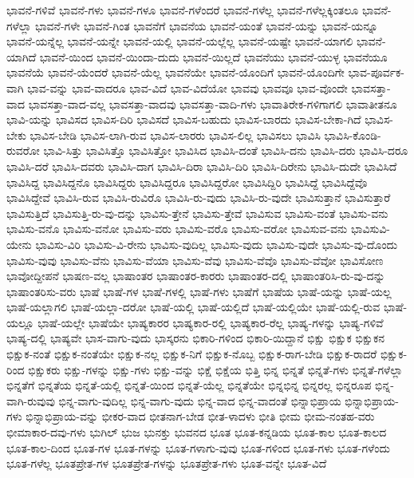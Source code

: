{ಭಾವನೆ-ಗಳಿವೆ
ಭಾವನೆ-ಗಳು
ಭಾವನೆ-ಗಳೂ
ಭಾವನೆ-ಗಳೆಂದರೆ
ಭಾವನೆ-ಗಳೆಲ್ಲ
ಭಾವನೆ-ಗಳೆಲ್ಲಕ್ಕಿಂತಲೂ
ಭಾವನೆ-ಗಳೆಲ್ಲಾ
ಭಾವನೆ-ಗಳೇ
ಭಾವನೆ-ಗಿಂತ
ಭಾವನೆಗೆ
ಭಾವನೆಯ
ಭಾವನೆ-ಯಂತೆ
ಭಾವನೆ-ಯನ್ನು
ಭಾವನೆ-ಯನ್ನೂ
ಭಾವನೆ-ಯನ್ನೆಲ್ಲ
ಭಾವನೆ-ಯನ್ನೇ
ಭಾವನೆ-ಯಲ್ಲಿ
ಭಾವನೆ-ಯಲ್ಲೆಲ್ಲ
ಭಾವನೆ-ಯಷ್ಟೇ
ಭಾವನೆ-ಯಾಗಲಿ
ಭಾವನೆ-ಯಾಗಿದೆ
ಭಾವನೆ-ಯಿಂದ
ಭಾವನೆ-ಯಿಂದಾ-ದುದು
ಭಾವನೆ-ಯಿಲ್ಲದೆ
ಭಾವನೆಯು
ಭಾವನೆ-ಯುಳ್ಳ
ಭಾವನೆಯೂ
ಭಾವನೆಯೆ
ಭಾವನೆ-ಯೆಂದರೆ
ಭಾವನೆ-ಯೆಲ್ಲ
ಭಾವನೆಯೇ
ಭಾವನೆ-ಯೊಂದಿಗೆ
ಭಾವನೆ-ಯೊಂದಿಗೇ
ಭಾವ-ಪೂರ್ವಕ-ವಾಗಿ
ಭಾವ-ವನ್ನು
ಭಾವ-ವಾದರೂ
ಭಾವ-ವಿದೆ
ಭಾವ-ವಿದೆಯೋ
ಭಾವವು
ಭಾವವೂ
ಭಾವ-ವೊಂದೇ
ಭಾವಸತ್ತಾ-ವಾದ
ಭಾವಸತ್ತಾ-ವಾದ-ವಲ್ಲ
ಭಾವಸತ್ತಾ-ವಾದವು
ಭಾವಸತ್ತಾ-ವಾದಿ-ಗಳು
ಭಾವಾತಿರೇಕ-ಗಳಿಗಾಗಲಿ
ಭಾವಾತೀತನೂ
ಭಾವಿ-ಯನ್ನು
ಭಾವಿಸದ
ಭಾವಿಸ-ದಿರಿ
ಭಾವಿಸದೆ
ಭಾವಿಸ-ಬಹುದು
ಭಾವಿಸ-ಬಾರದು
ಭಾವಿಸ-ಬೇಕಾ-ಗಿದೆ
ಭಾವಿಸ-ಬೇಕು
ಭಾವಿಸ-ಬೇಡಿ
ಭಾವಿಸ-ಲಾಗಿ-ರುವ
ಭಾವಿಸ-ಲಾರರು
ಭಾವಿಸ-ಲಿಲ್ಲ
ಭಾವಿಸಲು
ಭಾವಿಸಿ
ಭಾವಿಸಿ-ಕೊಂಡಿ-ರುವರೋ
ಭಾವಿ-ಸಿತ್ತು
ಭಾವಿಸಿತ್ತೊ
ಭಾವಿಸಿತ್ತೋ
ಭಾವಿಸಿದ
ಭಾವಿಸಿ-ದಂತೆ
ಭಾವಿಸಿ-ದನು
ಭಾವಿಸಿ-ದರು
ಭಾವಿಸಿ-ದರೂ
ಭಾವಿಸಿ-ದರೆ
ಭಾವಿಸಿ-ದವರು
ಭಾವಿಸಿ-ದಾಗ
ಭಾವಿಸಿ-ದಿರಾ
ಭಾವಿಸಿ-ದಿರಿ
ಭಾವಿಸಿ-ದಿರೇನು
ಭಾವಿಸಿ-ದುದೇ
ಭಾವಿಸಿದೆ
ಭಾವಿಸಿದ್ದ
ಭಾವಿಸಿದ್ದನೊ
ಭಾವಿಸಿದ್ದರು
ಭಾವಿಸಿದ್ದರೂ
ಭಾವಿಸಿದ್ದರೋ
ಭಾವಿಸಿದ್ದಿರಿ
ಭಾವಿಸಿದ್ದೆ
ಭಾವಿಸಿದ್ದೆವೊ
ಭಾವಿಸಿದ್ದೇವೆ
ಭಾವಿಸಿ-ರುವ
ಭಾವಿಸಿ-ರುವಿರೊ
ಭಾವಿಸಿ-ರು-ವುದು
ಭಾವಿಸಿ-ರು-ವುದೇ
ಭಾವಿಸುತ್ತಾನೆ
ಭಾವಿಸುತ್ತಾರೆ
ಭಾವಿಸುತ್ತಿದೆ
ಭಾವಿಸುತ್ತಿ-ರು-ವು-ದನ್ನು
ಭಾವಿಸು-ತ್ತೇನೆ
ಭಾವಿಸು-ತ್ತೇವೆ
ಭಾವಿಸುವ
ಭಾವಿಸು-ವಂತೆ
ಭಾವಿಸು-ವನು
ಭಾವಿಸು-ವನೊ
ಭಾವಿಸು-ವನೋ
ಭಾವಿಸು-ವರು
ಭಾವಿಸು-ವರೊ
ಭಾವಿಸು-ವರೋ
ಭಾವಿಸುವ-ವನು
ಭಾವಿಸುವಿ-ಯೇನು
ಭಾವಿಸು-ವಿರಿ
ಭಾವಿಸು-ವಿ-ರೇನು
ಭಾವಿಸು-ವುದಿಲ್ಲ
ಭಾವಿಸು-ವುದು
ಭಾವಿಸು-ವುದೇ
ಭಾವಿಸು-ವು-ದೊಂದು
ಭಾವಿಸು-ವುವು
ಭಾವಿಸು-ವೆನು
ಭಾವಿಸು-ವೆಯಾ
ಭಾವಿಸು-ವೆವು
ಭಾವಿಸು-ವೆವೊ
ಭಾವಿಸು-ವೆವೋ
ಭಾವಿಸೋಣ
ಭಾವೋದ್ದೀಪನೆ
ಭಾಷಣ-ವಲ್ಲ
ಭಾಷಾಂತರ
ಭಾಷಾಂತರ-ಕಾರರು
ಭಾಷಾಂತರ-ದಲ್ಲಿ
ಭಾಷಾಂತರಿಸಿ-ರು-ವು-ದನ್ನು
ಭಾಷಾಂತರಿಸು-ವರು
ಭಾಷೆ
ಭಾಷೆ-ಗಳ
ಭಾಷೆ-ಗಳಲ್ಲಿ
ಭಾಷೆ-ಗಳು
ಭಾಷೆಗೆ
ಭಾಷೆಯ
ಭಾಷೆ-ಯನ್ನು
ಭಾಷೆ-ಯಲ್ಲ
ಭಾಷೆ-ಯಲ್ಲಾಗಲಿ
ಭಾಷೆ-ಯಲ್ಲಾ-ದರೋ
ಭಾಷೆ-ಯಲ್ಲಿ
ಭಾಷೆ-ಯಲ್ಲಿದೆ
ಭಾಷೆ-ಯಲ್ಲಿಯೇ
ಭಾಷೆ-ಯಲ್ಲಿ-ರುವ
ಭಾಷೆ-ಯಲ್ಲೂ
ಭಾಷೆ-ಯಲ್ಲೇ
ಭಾಷೆಯೇ
ಭಾಷ್ಯಕಾರರ
ಭಾಷ್ಯಕಾರ-ರಲ್ಲಿ
ಭಾಷ್ಯಕಾರ-ರೆಲ್ಲ
ಭಾಷ್ಯ-ಗಳನ್ನು
ಭಾಷ್ಯ-ಗಳಿವೆ
ಭಾಷ್ಯ-ದಲ್ಲಿ
ಭಾಷ್ಯವೇ
ಭಾಸ-ವಾಗು-ವುದು
ಭಾಸ್ಕರನು
ಭಿಕಾರಿ-ಗಳಿಂದ
ಭಿಕಾರಿ-ಯಿದ್ದಾನೆ
ಭಿಕ್ಷು
ಭಿಕ್ಷುಕ
ಭಿಕ್ಷುಕನ
ಭಿಕ್ಷುಕ-ನಂತೆ
ಭಿಕ್ಷುಕ-ನಂತೆಯೇ
ಭಿಕ್ಷುಕ-ನಲ್ಲ
ಭಿಕ್ಷುಕ-ನಿಗೆ
ಭಿಕ್ಷುಕ-ನೊಬ್ಬ
ಭಿಕ್ಷುಕ-ರಾಗ-ಬೇಡಿ
ಭಿಕ್ಷುಕ-ರಾದರೆ
ಭಿಕ್ಷುಕ-ರಿಂದ
ಭಿಕ್ಷುಕರು
ಭಿಕ್ಷು-ಗಳನ್ನು
ಭಿಕ್ಷು-ಗಳು
ಭಿಕ್ಷು-ವನ್ನು
ಭಿಕ್ಷೆ
ಭಿಕ್ಷೆಯ
ಭಿತ್ತಿ
ಭಿನ್ನ
ಭಿನ್ನತೆ
ಭಿನ್ನತೆ-ಗಳು
ಭಿನ್ನತೆ-ಗಳೆಲ್ಲಾ
ಭಿನ್ನತೆಗೆ
ಭಿನ್ನತೆಯ
ಭಿನ್ನತೆ-ಯಲ್ಲಿ
ಭಿನ್ನತೆ-ಯಿಂದ
ಭಿನ್ನತೆ-ಯೆಲ್ಲ
ಭಿನ್ನತೆಯೇ
ಭಿನ್ನಭಿನ್ನ
ಭಿನ್ನರಲ್ಲ
ಭಿನ್ನರೂಪ
ಭಿನ್ನ-ವಾಗಿ-ರುವುವು
ಭಿನ್ನ-ವಾಗು-ವುದಿಲ್ಲ
ಭಿನ್ನ-ವಾಗು-ವುದು
ಭಿನ್ನ-ವಾದ
ಭಿನ್ನ-ವಾದಂತೆ
ಭಿನ್ನಾಭಿಪ್ರಾಯ
ಭಿನ್ನಾಭಿಪ್ರಾಯ-ಗಳು
ಭಿನ್ನಾಭಿಪ್ರಾಯ-ವನ್ನು
ಭೀಕರ-ವಾದ
ಭೀತನಾಗ-ಬೇಡ
ಭೀತ-ಳಾದಳು
ಭೀತಿ
ಭೀಮ
ಭೀಮ-ನಂತಹ-ವರು
ಭೀಮಾಕಾರ-ದವು-ಗಳು
ಭುಗಿಲ್
ಭುಜ
ಭುನಕ್ತು
ಭುವನದ
ಭೂತ
ಭೂತ-ಕನ್ನಡಿಯ
ಭೂತ-ಕಾಲ
ಭೂತ-ಕಾಲದ
ಭೂತ-ಕಾಲ-ದಿಂದ
ಭೂತ-ಗಳ
ಭೂತ-ಗಳನ್ನು
ಭೂತ-ಗಳಾಗು-ವುವು
ಭೂತ-ಗಳಿಂದ
ಭೂತ-ಗಳು
ಭೂತ-ಗಳೆಂದು
ಭೂತ-ಗಳೆಲ್ಲ
ಭೂತಪ್ರೇತ-ಗಳ
ಭೂತಪ್ರೇತ-ಗಳನ್ನು
ಭೂತಪ್ರೇತ-ಗಳು
ಭೂತ-ವನ್ನೇ
ಭೂತ-ವಿದೆ
}
